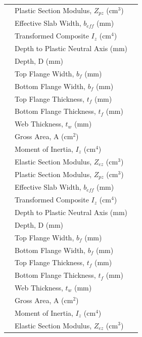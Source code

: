 \documentclass[12pt,a4paper]{report}
\numberwithin{figure}{chapter}
\begin{document}
\begin{longtable}{|C{3.95cm}|L{6.55cm}|C{3.63cm}|}
 & Plastic Section Modulus, $Z_{pz}$ (cm$^3$) &  \\*
 & Effective Slab Width, $b_{eff}$ (mm) &  \\*
 & Transformed Composite $I_z$ (cm$^4$) &  \\*
 & Depth to Plastic Neutral Axis (mm) &  \\
\hline
{}
 & Depth, D (mm) &  \\*
 & Top Flange Width, $b_f$ (mm) &  \\*
 & Bottom Flange Width, $b_f$ (mm) &  \\*
 & Top Flange Thickness, $t_f$ (mm) &  \\*
 & Bottom Flange Thickness, $t_f$ (mm) &  \\*
 & Web Thickness, $t_w$ (mm) &  \\*
 & Gross Area, A (cm$^2$) &  \\*
 & Moment of Inertia, $I_z$ (cm$^4$) &  \\*
 & Elastic Section Modulus, $Z_{ez}$ (cm$^3$) &  \\*
 & Plastic Section Modulus, $Z_{pz}$ (cm$^3$) &  \\
\hline
{}
 & Effective Slab Width, $b_{eff}$ (mm) &  \\*
 & Transformed Composite $I_z$ (cm$^4$) &  \\*
 & Depth to Plastic Neutral Axis (mm) &  \\
\hline
{}
 & Depth, D (mm) &  \\*
 & Top Flange Width, $b_f$ (mm) &  \\*
 & Bottom Flange Width, $b_f$ (mm) &  \\*
 & Top Flange Thickness, $t_f$ (mm) &  \\*
 & Bottom Flange Thickness, $t_f$ (mm) &  \\*
 & Web Thickness, $t_w$ (mm) &  \\*
 & Gross Area, A (cm$^2$) &  \\*
 & Moment of Inertia, $I_z$ (cm$^4$) &  \\*
 & Elastic Section Modulus, $Z_{ez}$ (cm$^3$) &  \\*

\end{longtable}
\end{document}
